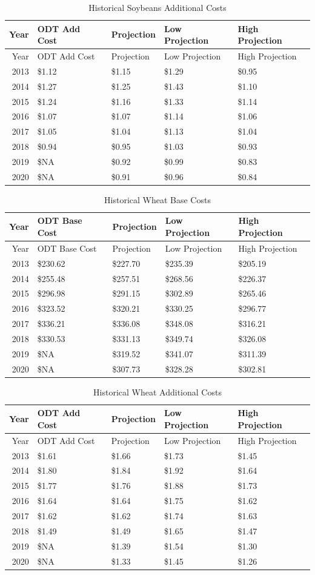 \documentclass[]{article}
\begin{document}
\begin{longtable}[]{@{}rllll@{}}
\caption{Historical Soybeans Additional Costs}\tabularnewline
\toprule
Year & ODT Add Cost & Projection & Low Projection & High
Projection\tabularnewline
\midrule
\endfirsthead
\toprule
Year & ODT Add Cost & Projection & Low Projection & High
Projection\tabularnewline
\midrule
\endhead
2013 & \$1.12 & \$1.15 & \$1.29 & \$0.95\tabularnewline
2014 & \$1.27 & \$1.25 & \$1.43 & \$1.10\tabularnewline
2015 & \$1.24 & \$1.16 & \$1.33 & \$1.14\tabularnewline
2016 & \$1.07 & \$1.07 & \$1.14 & \$1.06\tabularnewline
2017 & \$1.05 & \$1.04 & \$1.13 & \$1.04\tabularnewline
2018 & \$0.94 & \$0.95 & \$1.03 & \$0.93\tabularnewline
2019 & \$NA & \$0.92 & \$0.99 & \$0.83\tabularnewline
2020 & \$NA & \$0.91 & \$0.96 & \$0.84\tabularnewline
\bottomrule
\end{longtable}

\newpage

\begin{longtable}[]{@{}rllll@{}}
\caption{Historical Wheat Base Costs}\tabularnewline
\toprule
Year & ODT Base Cost & Projection & Low Projection & High
Projection\tabularnewline
\midrule
\endfirsthead
\toprule
Year & ODT Base Cost & Projection & Low Projection & High
Projection\tabularnewline
\midrule
\endhead
2013 & \$230.62 & \$227.70 & \$235.39 & \$205.19\tabularnewline
2014 & \$255.48 & \$257.51 & \$268.56 & \$226.37\tabularnewline
2015 & \$296.98 & \$291.15 & \$302.89 & \$265.46\tabularnewline
2016 & \$323.52 & \$320.21 & \$330.25 & \$296.77\tabularnewline
2017 & \$336.21 & \$336.08 & \$348.08 & \$316.21\tabularnewline
2018 & \$330.53 & \$331.13 & \$349.74 & \$326.08\tabularnewline
2019 & \$NA & \$319.52 & \$341.07 & \$311.39\tabularnewline
2020 & \$NA & \$307.73 & \$328.28 & \$302.81\tabularnewline
\bottomrule
\end{longtable}

\begin{longtable}[]{@{}rllll@{}}
\caption{Historical Wheat Additional Costs}\tabularnewline
\toprule
Year & ODT Add Cost & Projection & Low Projection & High
Projection\tabularnewline
\midrule
\endfirsthead
\toprule
Year & ODT Add Cost & Projection & Low Projection & High
Projection\tabularnewline
\midrule
\endhead
2013 & \$1.61 & \$1.66 & \$1.73 & \$1.45\tabularnewline
2014 & \$1.80 & \$1.84 & \$1.92 & \$1.64\tabularnewline
2015 & \$1.77 & \$1.76 & \$1.88 & \$1.73\tabularnewline
2016 & \$1.64 & \$1.64 & \$1.75 & \$1.62\tabularnewline
2017 & \$1.62 & \$1.62 & \$1.74 & \$1.63\tabularnewline
2018 & \$1.49 & \$1.49 & \$1.65 & \$1.47\tabularnewline
2019 & \$NA & \$1.39 & \$1.54 & \$1.30\tabularnewline
2020 & \$NA & \$1.33 & \$1.45 & \$1.26\tabularnewline
\bottomrule
\end{longtable}
\end{document}
